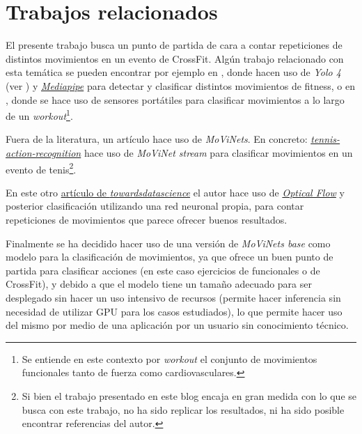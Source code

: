 \section{Trabajos relacionados}

El presente trabajo busca un punto de partida de cara a contar repeticiones de distintos movimientos en un evento de CrossFit. Algún trabajo relacionado con esta temática se pueden encontrar por ejemplo en 
\cite{FitnessMovementTypes}, donde hacen uso de \textit{Yolo 4} (ver 
\cite{Yolo4}) y \href{https://mediapipe.dev/}{\textit{Mediapipe}} para detectar y clasificar distintos movimientos de fitness, o en \cite{ClassifyFunctionalFitness}, donde se hace uso de sensores portátiles para clasificar movimientos a lo largo de un \textit{workout}\footnote{Se entiende en este contexto por \textit{workout} el conjunto de movimientos funcionales tanto de fuerza como cardiovasculares.}. 

Fuera de la literatura, un artículo hace uso de \textit{MoViNets}.
En concreto: \href{https://blog.ml6.eu/sports-video-analysis-in-the-real-world-realtime-tennis-action-recognition-using-movinet-stream-813200aa589f}{\textit{tennis-action-recognition}} hace uso de \textit{MoViNet stream} para clasificar movimientos en un evento de tenis\footnote{Si bien el trabajo presentado en este blog encaja en gran medida con lo que se busca con este trabajo, no ha sido replicar los resultados, ni ha sido posible encontrar referencias del autor.}.

En este otro \href{https://towardsdatascience.com/how-i-created-the-workout-movement-counting-app-using-deep-learning-and-optical-flow-89f9d2e087ac}{artículo de \textit{towardsdatascience}} el autor hace uso de \href{https://docs.opencv.org/3.4/d4/dee/tutorial_optical_flow.html}{\textit{Optical Flow}} y posterior clasificación utilizando una red neuronal propia, para contar repeticiones de movimientos que parece ofrecer buenos resultados.

Finalmente se ha decidido hacer uso de una versión de \textit{MoViNets base} como modelo para la clasificación de movimientos, ya que ofrece un buen punto de partida para clasificar acciones (en este caso ejercicios de funcionales o de CrossFit), y debido a que el modelo tiene un tamaño adecuado para ser desplegado sin hacer un uso intensivo de recursos (permite hacer inferencia sin necesidad de utilizar GPU para los casos estudiados), lo que permite hacer uso del mismo por medio de una aplicación por un usuario sin conocimiento técnico.

